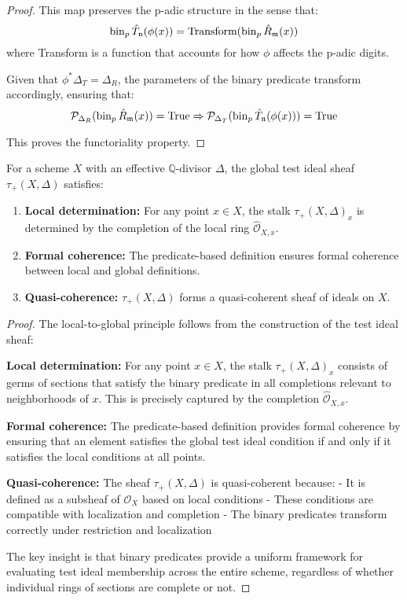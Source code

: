 \begin{proof}
This map preserves the p-adic structure in the sense that:
$$\operatorname{bin}_p{\hat{T}_{\mathfrak{n}}}(\phi(x)) = \text{Transform}(\operatorname{bin}_p{\hat{R}_{\mathfrak{m}}}(x))$$
where Transform is a function that accounts for how $\phi$ affects the p-adic digits.

Given that $\phi^*\Delta_T = \Delta_R$, the parameters of the binary predicate transform accordingly, ensuring that:
$$\mathcal{P}_{\Delta_R}(\operatorname{bin}_p{\hat{R}_{\mathfrak{m}}}(x)) = \text{True} \Rightarrow \mathcal{P}_{\Delta_T}(\operatorname{bin}_p{\hat{T}_{\mathfrak{n}}}(\phi(x))) = \text{True}$$

This proves the functoriality property.
\end{proof}

\begin{theorem}\label{thm:local-to-global}
For a scheme $X$ with an effective $\mathbb{Q}$-divisor $\Delta$, the global test ideal sheaf $\tau_+(X,\Delta)$ satisfies:

\begin{enumerate}
    \item \textbf{Local determination:} For any point $x \in X$, the stalk $\tau_+(X,\Delta)_x$ is determined by the completion of the local ring $\hat{\mathcal{O}}_{X,x}$.
    
    \item \textbf{Formal coherence:} The predicate-based definition ensures formal coherence between local and global definitions.
    
    \item \textbf{Quasi-coherence:} $\tau_+(X,\Delta)$ forms a quasi-coherent sheaf of ideals on $X$.
\end{enumerate}
\end{theorem}

\begin{proof}
The local-to-global principle follows from the construction of the test ideal sheaf:

\textbf{Local determination:} For any point $x \in X$, the stalk $\tau_+(X,\Delta)_x$ consists of germs of sections that satisfy the binary predicate in all completions relevant to neighborhoods of $x$. This is precisely captured by the completion $\hat{\mathcal{O}}_{X,x}$.

\textbf{Formal coherence:} The predicate-based definition provides formal coherence by ensuring that an element satisfies the global test ideal condition if and only if it satisfies the local conditions at all points.

\textbf{Quasi-coherence:} The sheaf $\tau_+(X,\Delta)$ is quasi-coherent because:
- It is defined as a subsheaf of $\mathcal{O}_X$ based on local conditions
- These conditions are compatible with localization and completion
- The binary predicates transform correctly under restriction and localization

The key insight is that binary predicates provide a uniform framework for evaluating test ideal membership across the entire scheme, regardless of whether individual rings of sections are complete or not.
\end{proof}

